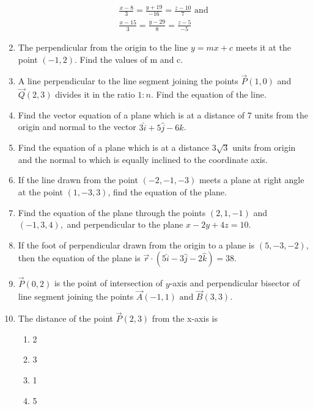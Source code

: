 \begin{enumerate}[label=\thesubsection.\arabic*, ref=\thesubsection.\theenumi]
\begin{align}
	\frac{x-8}{3}=\frac{y+19}{-16}=\frac{z-10}{7} \text{ and }\\ \frac{x-15}{3}=\frac{y-29}{8}=\frac{z-5}{-5} 
\end{align}
    \solution
		
 \item The perpendicular from the origin to the line $y=mx+c$ meets it at the point $(-1, 2)$. Find the values of m and c.
 \label{11.10.3.15}
	 \\
 \solution
 
\item 
A line perpendicular to the line segment joining the points $\vec{P}(1, 0)$ and $\vec{Q}(2, 3)$ divides it in the ratio $1:n$. Find the equation of the line.
	\\
	\solution 
\label{chapters/11/10/2/11}

\item Find the vector equation of a plane which is at a distance of 7 units from the origin and normal to the vector $3\hat{i}+5\hat{j}-6\hat{k}$.
	\\
    \solution
		
\item Find the equation of a plane which is at a distance 3$\sqrt{3}$ units from origin and the normal to which is equally inclined to the coordinate axis.
\item If the line drawn from the point $(-2, -1, -3)$ meets a plane at right angle at the point $(1, -3, 3)$,  find the equation of the plane.
\item Find the equation of the plane through the points $(2, 1, -1)$ and $(-1, 3, 4), $ and 
perpendicular to the plane $x-2y+4z=10.$
\item If the foot of perpendicular drawn from the origin to a plane is $(5, -3, -2)$,  then the equation of the plane is $\overrightarrow{r} \cdot (5\hat{i}-3\hat{j}-2\hat{k})=38.$
\item  $\vec{P}(0, 2)$ is the point of intersection of $y$-axis and perpendicular bisector of line segment joining the points $\vec{A}(-1, 1) \text{ and } \vec{B}(3, 3)$.
	\item The distance of the point $\vec{P}(2,  3)$ from the x-axis is

\begin{enumerate}
\item 2
\item 3
\item 1
\item 5 
\end{enumerate}


\end{enumerate}
